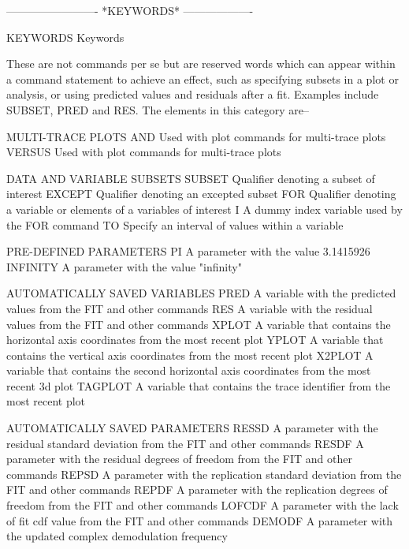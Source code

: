  
 
 
 
 
 
 
 
 
 
 
 
-------------------------  *KEYWORDS*  -------------------
 
KEYWORDS
Keywords
 
These are not commands per se but are reserved words which can appear
within a command statement to achieve an effect, such as specifying
subsets in a plot or analysis, or using predicted values and residuals
after a fit.  Examples include SUBSET, PRED and RES.  The elements in
this category are--
 
MULTI-TRACE PLOTS
   AND                  Used with plot commands for multi-trace plots
   VERSUS               Used with plot commands for multi-trace plots
 
DATA AND VARIABLE SUBSETS
   SUBSET               Qualifier denoting a subset of interest
   EXCEPT               Qualifier denoting an excepted subset
   FOR                  Qualifier denoting a variable or elements of a
                        variables of interest
   I                    A dummy index variable used by the FOR command
   TO                   Specify an interval of values within a variable
 
PRE-DEFINED PARAMETERS
   PI                   A parameter with the value 3.1415926
   INFINITY             A parameter with the value "infinity"
 
AUTOMATICALLY SAVED VARIABLES
   PRED                 A variable with the predicted values from the
                        FIT and other commands
   RES                  A variable with the residual values from the
                        FIT and other commands
   XPLOT                A variable that contains the horizontal axis
                        coordinates from the most recent plot
   YPLOT                A variable that contains the vertical axis
                        coordinates from the most recent plot
   X2PLOT               A variable that contains the second horizontal
                        axis coordinates from the most recent 3d plot
   TAGPLOT              A variable that contains the trace identifier
                        from the most recent plot
 
AUTOMATICALLY SAVED PARAMETERS
   RESSD                A parameter with the residual standard
                        deviation from the FIT and other commands
   RESDF                A parameter with the residual degrees of
                        freedom from the FIT and other commands
   REPSD                A parameter with the replication standard
                        deviation from the FIT and other commands
   REPDF                A parameter with the replication degrees of
                        freedom from the FIT and other commands
   LOFCDF               A parameter with the lack of fit cdf value from
                        the FIT and other commands
   DEMODF               A parameter with the updated complex
                        demodulation frequency
 
